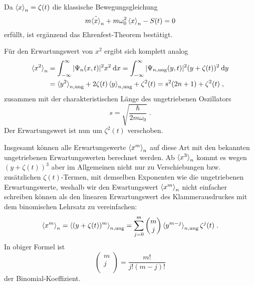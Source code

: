     Da $\braket{x}_n=\zeta(t)$ die klassische Bewegungsgleichung
    \begin{equation}
      m\ddot{\braket{x}}_n + m\omega_0^2\braket{x}_n - S(t) = 0
    \end{equation}
    erfüllt, ist ergänzend das Ehrenfest-Theorem bestätigt.

    Für den Erwartungswert von $x^2$ ergibt sich komplett analog
    \begin{align}
      \braket{x^2}_n &= \int_{-\infty}^{\infty} |\Psi_n(x,t)|^2 x^2 \: \text dx
      = \int_{-\infty}^{\infty} |\Psi_{n,\text{ung}}(y,t)|^2 (y+\zeta(t))^2 \: \text dy \notag \\
      &= \braket{y^2}_{n,\text{ung}} + 2\zeta(t)\braket{y}_{n,\text{ung}} + \zeta^2(t)
      = s^2(2n+1) + \zeta^2(t) \; ,
      \label{erwartungswert_x^2_einzelner}
    \end{align}
    zusammen mit der charakteristischen Länge des ungetriebenen Oszillators
    \begin{equation}
      s = \sqrt{\frac{\hbar}{2m\omega_0}} \; .
      \label{charak_laenge}
    \end{equation}
    Der Erwartungswert ist nun um $\zeta^2(t)$ verschoben.

    Insgesamt können alle Erwartungswerte $\braket{x^m}_n$ auf diese Art mit den bekannten ungetriebenen Erwartungswerten berechnet werden.
    Ab $\braket{x^3}_n$ kommt es wegen $(y+\zeta(t))^3$ aber im Allgemeinen nicht nur zu Verschiebungen bzw. zusätzlichen $\zeta(t)$-Termen, mit demselben Exponenten wie die ungetriebenen Erwartungswerte, weshalb wir den Ewartungswert $\braket{x^m}_n$ nicht einfacher schreiben können als den linearen Erwartungswert des Klammerausdruckes mit dem binomischen Lehrsatz zu vereinfachen:
    \begin{equation}
      \braket{x^m}_n = \braket{(y+\zeta(t))^m}_{n,\text{ung}} = \sum_{j=0}^m \begin{pmatrix} m \\ j \\ \end{pmatrix} \braket{y^{m-j}}_{n,\text{ung}}\zeta^j(t) \; .
    \end{equation}
    In obiger Formel ist
    \begin{equation}
      \begin{pmatrix} m \\ j \\ \end{pmatrix} = \frac{m!}{j!(m-j)!}
    \end{equation}
    der Binomial-Koeffizient.

